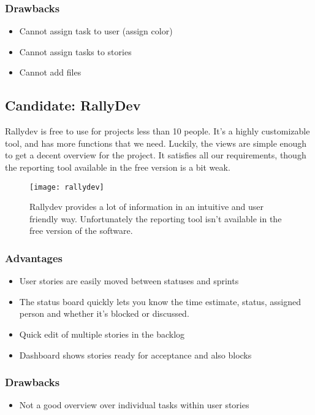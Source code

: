 \documentclass{report}
\begin{document}
\subsubsection{Drawbacks}
\begin{itemize}
\item Cannot assign task to user (assign color)
\item Cannot assign tasks to stories
\item Cannot add files
\end{itemize}

\newpage
\subsection{Candidate: RallyDev}

Rallydev\cite{website:rallydev} is free to use for projects less than 10 people. It’s a highly customizable tool, and has more functions that we need. Luckily, the views are simple enough to get a decent overview for the project. It satisfies all our requirements, though the reporting tool available in the free version is a bit weak.

\begin{figure}[H]
    \centering
    \texttt{[image: rallydev]}
    \caption{Rallydev provides a lot of information in an intuitive and user friendly way. Unfortunately the reporting tool isn't available in the free version of the software.}  
    \label{fig:rallydev}
\end{figure}

\subsubsection{Advantages}
\begin{itemize}
\item User stories are easily moved between statuses and sprints
\item The status board quickly lets you know the time estimate, status, assigned person and whether it’s blocked or discussed.
\item Quick edit of multiple stories in the backlog
\item Dashboard shows stories ready for acceptance and also blocks
\end{itemize}

\subsubsection{Drawbacks}
\begin{itemize}
\item Not a good overview over individual tasks within user stories
\end{itemize}
\end{document}
